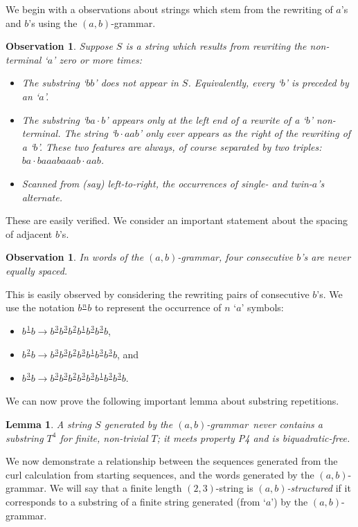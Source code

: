\documentclass[11pt]{article}
\def\emph#1{{\em #1\/}}
\def\term#1{\emph{#1}}
\newcounter{thm}
\newtheorem{lemma}[thm]{Lemma}
\newtheorem{observation}[thm]{Observation}
\def\ni{\noindent}
\def\s#1{\frac{#1}{}}
\def\ab{$(a,b)$}
\def\twth{$(2,3)$}
\def\abg{\ab-grammar}
\def\abs{\ab-structured}
\def\q#1{`$#1$'}
\begin{document}
We begin with a observations
about strings which stem from the rewriting of $a$'s and $b$'s using the
\abg.
\begin{observation}
Suppose $S$ is a string which results from rewriting the non-terminal
\q{a} zero or more times:
\begin{itemize}
\item The substring \q{bb} does not appear in $S$.  Equivalently,
every \q{b} is preceded by an \q{a}.
\item The substring \q{ba\cdot b} appears only at the left end of a
rewrite of a \q{b} non-terminal.  The string \q{b\cdot aab} only ever appears
as the right of the rewriting of a \q{b}.  These two features are always, of
course separated by two triples: $ba\cdot baaabaaab\cdot aab$.
\item Scanned from (say) left-to-right, the occurrences of single- and twin-$a$'s alternate.
\end{itemize}
\end{observation}
\ni These are easily verified. We consider an important statement about
the spacing of adjacent $b$'s.

\begin{observation}\label{obs:fourb}
In words of the \abg, four consecutive $b$'s are never equally spaced.
\end{observation}
\ni This is easily observed by considering the rewriting pairs of consecutive $b$'s. We
use the notation $b\s{n}b$ to represent the occurrence of $n$ \q{a} symbols:
\begin{itemize}
\item $b\s{1}b\rightarrow b\s{3}b\s{3}b\s{2}b\s{1}b\s{3}b\s{3}b$,
\item $b\s{2}b\rightarrow b\s{3}b\s{3}b\s{2}b\s{3}b\s{1}b\s{3}b\s{3}b$, and
\item $b\s{3}b\rightarrow b\s{3}b\s{3}b\s{2}b\s{3}b\s{3}b\s{1}b\s{3}b\s{3}b$.
\end{itemize}

\ni We can now prove the following important lemma about substring repetitions.
\begin{lemma}\label{lemma:p4}
A string $S$ generated by the \abg\ never contains a substring $T^4$ for
finite, non-trivial $T$; it meets property P4 and is \term{biquadratic-free}.
\end{lemma}

\medskip

We now demonstrate a relationship between the sequences generated from the
curl calculation from starting sequences, and the words generated by the
\abg. We will say that a finite length \twth-string is \term{\abs}
if it corresponds to a substring of a finite string generated (from \q{a}) by the
\abg.
\end{document}

